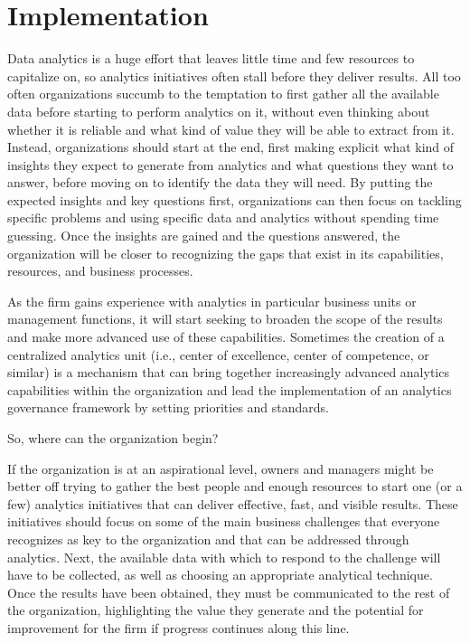 \documentclass[
  letterpaper,
  DIV=11,
  numbers=noendperiod]{scrreprt}
\begin{document}
\hypertarget{implementation}{%
\section{Implementation}\label{implementation}}

Data analytics is a huge effort that leaves little time and few
resources to capitalize on, so analytics initiatives often stall before
they deliver results. All too often organizations succumb to the
temptation to first gather all the available data before starting to
perform analytics on it, without even thinking about whether it is
reliable and what kind of value they will be able to extract from it.
Instead, organizations should start at the end, first making explicit
what kind of insights they expect to generate from analytics and what
questions they want to answer, before moving on to identify the data
they will need. By putting the expected insights and key questions
first, organizations can then focus on tackling specific problems and
using specific data and analytics without spending time guessing. Once
the insights are gained and the questions answered, the organization
will be closer to recognizing the gaps that exist in its capabilities,
resources, and business processes.

As the firm gains experience with analytics in particular business units
or management functions, it will start seeking to broaden the scope of
the results and make more advanced use of these capabilities. Sometimes
the creation of a centralized analytics unit (i.e., center of
excellence, center of competence, or similar) is a mechanism that can
bring together increasingly advanced analytics capabilities within the
organization and lead the implementation of an analytics governance
framework by setting priorities and standards.

So, where can the organization begin?

If the organization is at an aspirational level, owners and managers
might be better off trying to gather the best people and enough
resources to start one (or a few) analytics initiatives that can deliver
effective, fast, and visible results. These initiatives should focus on
some of the main business challenges that everyone recognizes as key to
the organization and that can be addressed through analytics. Next, the
available data with which to respond to the challenge will have to be
collected, as well as choosing an appropriate analytical technique. Once
the results have been obtained, they must be communicated to the rest of
the organization, highlighting the value they generate and the potential
for improvement for the firm if progress continues along this line.
\end{document}
